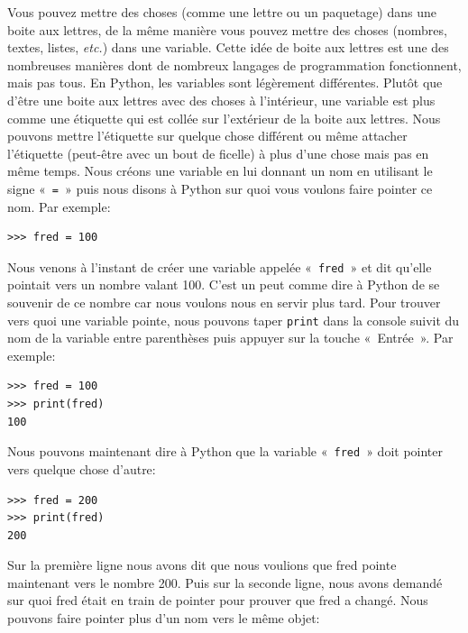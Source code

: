 Vous pouvez mettre des choses (comme une lettre ou un paquetage) dans une boite aux lettres, de la même manière vous pouvez mettre des choses (nombres, textes, listes, \emph{etc.}) dans une variable. Cette idée de boite aux lettres est une des nombreuses manières dont de nombreux langages de programmation fonctionnent, mais pas tous.
En Python, les variables sont légèrement différentes. Plutôt que d'être une boite aux lettres avec des choses à l'intérieur, une variable est plus comme une étiquette qui est collée sur l'extérieur de la boite aux lettres. Nous pouvons mettre l'étiquette sur quelque chose différent ou même attacher l'étiquette (peut-être avec un bout de ficelle) à plus d'une chose mais pas en même temps. Nous créons une variable en lui donnant un nom en utilisant le signe «~\texttt{=}~» puis nous disons à Python sur quoi vous voulons faire pointer ce nom. Par exemple:\\

\begin{Verbatim}[frame=single,rulecolor=\color{mbleu}, label=à taper]
>>> fred = 100
\end{Verbatim}

Nous venons à l'instant de créer une variable appelée «~\texttt{fred}~» et dit qu'elle pointait vers un nombre valant 100. C'est un peut comme dire à Python de se souvenir de ce nombre car nous voulons nous en servir plus tard. Pour trouver vers quoi une variable pointe, nous pouvons taper \texttt{print} dans la console suivit du nom de la variable entre parenthèses puis appuyer sur la touche «~Entrée~». Par exemple:

\begin{Verbatim}[frame=single,rulecolor=\color{mbleu}, label=à taper]
>>> fred = 100
>>> print(fred)
100
\end{Verbatim}

Nous pouvons maintenant dire à Python que la variable «~\texttt{fred}~» doit pointer vers quelque chose d'autre:

\begin{Verbatim}[frame=single,rulecolor=\color{mbleu}, label=à taper]
>>> fred = 200
>>> print(fred)
200
\end{Verbatim}

Sur la première ligne nous avons dit que nous voulions que fred pointe maintenant vers le nombre 200. Puis sur la seconde ligne, nous avons demandé sur quoi fred était en train de pointer pour prouver que fred a changé. Nous pouvons faire pointer plus d'un nom vers le même objet:

